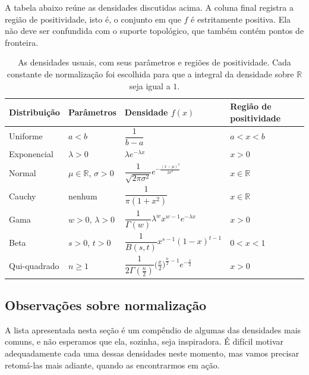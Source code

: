 \documentclass[12pt,portuguese]{article}
\theoremstyle{definition}
\theoremstyle{plainexercise}
\theoremstyle{starredexercise}
\theoremstyle{definition}
\begin{document}
\medskip

A tabela abaixo reúne as densidades discutidas acima. A coluna final registra a
região de positividade, isto é, o conjunto em que $f$ é estritamente positiva.
Ela não deve ser confundida com o suporte topológico, que também contém pontos
de fronteira.
\begin{table}[H]
  \centering
  \small
  \setlength{\tabcolsep}{18pt}
  \begin{tabular}{@{}llll@{}}
    \toprule
    Distribuição & Parâmetros & Densidade $f(x)$ & Região de positividade \\
    \midrule
    Uniforme & $a<b$ &
    $\dfrac{1}{b-a}$ & $a<x<b$ \\[0.45cm]
    Exponencial & $\lambda>0$ &
    $\lambda e^{-\lambda x}$ & $x>0$ \\[0.35cm]
    Normal & $\mu\in\mathbb{R}$, $\sigma>0$ &
    $\dfrac{1}{\sqrt{2\pi\sigma^2}}
     e^{-\frac{(x-\mu)^2}{2\sigma^2}}$ & $x\in\mathbb{R}$ \\[0.55cm]
    Cauchy & nenhum &
    $\dfrac{1}{\pi(1+x^2)}$ & $x\in\mathbb{R}$ \\[0.5cm]
    Gama & $w>0$, $\lambda>0$ &
    $\dfrac{1}{\Gamma(w)}\lambda^w x^{w-1}e^{-\lambda x}$ & $x>0$ \\[0.5cm]
    Beta & $s>0$, $t>0$ &
    $\dfrac{1}{B(s,t)}x^{s-1}(1-x)^{t-1}$ & $0<x<1$ \\[0.5cm]
    Qui-quadrado & $n\geqslant 1$ &
    $\dfrac{1}{2\Gamma(\frac{n}{2})}
     \bigl(\frac{x}{2}\bigr)^{\frac{n}{2}-1}e^{-\frac{x}{2}}$ & $x>0$ \\
    \bottomrule
  \end{tabular}
  \caption{As densidades usuais, com seus parâmetros e regiões de positividade. Cada
  constante de normalização foi escolhida para que a integral da densidade
  sobre $\mathbb{R}$ seja igual a $1$.}
  \label{tab:densidades-usuais}
\end{table}

\break 

\subsection{Observações sobre normalização}

A lista apresentada nesta seção é um compêndio de algumas
das densidades mais comuns, e não esperamos que ela, sozinha, seja
inspiradora. É difícil motivar adequadamente cada uma dessas densidades neste
momento, mas vamos precisar retomá-las mais adiante, quando as encontrarmos em
ação.
\end{document}
